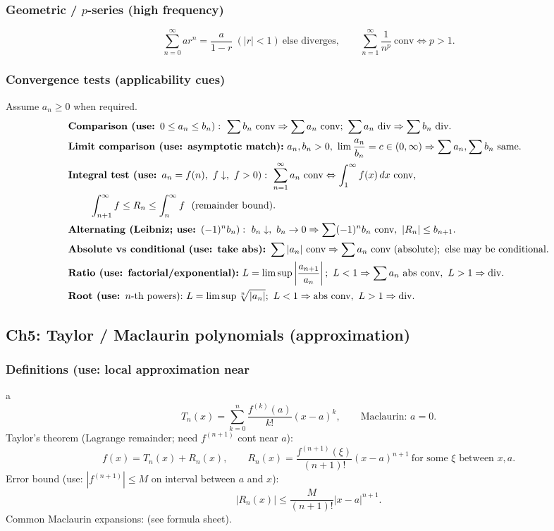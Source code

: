 \documentclass[12pt]{article}
\begin{document}
\subsubsection{Geometric / $p$-series (high frequency)}
\[
\sum_{n=0}^{\infty}ar^n=
\frac{a}{1-r}\ (|r|<1)\ \text{else diverges},\qquad
\sum_{n=1}^{\infty}\frac{1}{n^p}\ \text{conv}\Leftrightarrow p>1.
\]

\subsubsection{Convergence tests (applicability cues)}
Assume $a_n\ge 0$ when required.
\begin{align*}
&\textbf{Comparison (use: }0\le a_n\le b_n):\ \sum b_n\ \text{conv}\Rightarrow\sum a_n\ \text{conv};\ \sum a_n\ \text{div}\Rightarrow\sum b_n\ \text{div}.\\
&\textbf{Limit comparison (use: asymptotic match):}\ a_n,b_n>0,\ \lim \frac{a_n}{b_n}=c\in(0,\infty)\Rightarrow \sum a_n,\sum b_n\ \text{same}.\\
&\textbf{Integral test (use: }a_n=f(n),\ f\downarrow,\ f>0):\ \sum_{n=1}^{\infty}a_n\ \text{conv}\Leftrightarrow \int_1^{\infty} f(x)\,dx\ \text{conv},\\
&\hspace{2.2em}\int_{n+1}^{\infty} f\le R_n\le \int_n^{\infty} f\ \ (\text{remainder bound}).\\
&\textbf{Alternating (Leibniz; use: }(-1)^n b_n):\ b_n\downarrow,\ b_n\to 0\Rightarrow \sum (-1)^n b_n\ \text{conv},\ |R_n|\le b_{n+1}.\\
&\textbf{Absolute vs conditional (use: take abs):}\ \sum |a_n|\ \text{conv}\Rightarrow \sum a_n\ \text{conv (absolute)};\ \text{else may be conditional}.\\
&\textbf{Ratio (use: factorial/exponential):}\ L=\limsup\left|\frac{a_{n+1}}{a_n}\right|;\ L<1\Rightarrow \sum a_n\ \text{abs conv},\ L>1\Rightarrow \text{div}.\\
&\textbf{Root (use: }n\text{-th powers):}\ L=\limsup \sqrt[n]{|a_n|};\ L<1\Rightarrow \text{abs conv},\ L>1\Rightarrow \text{div}.
\end{align*}

\subsection{Ch5: Taylor / Maclaurin polynomials (approximation)}
\subsubsection{Definitions (use: local approximation near }a\text{)}
\[
T_n(x)=\sum_{k=0}^{n}\frac{f^{(k)}(a)}{k!}(x-a)^k,\qquad
\text{Maclaurin: }a=0.
\]
Taylor's theorem (Lagrange remainder; need $f^{(n+1)}$ cont near $a$):
\[
f(x)=T_n(x)+R_n(x),\qquad
R_n(x)=\frac{f^{(n+1)}(\xi)}{(n+1)!}(x-a)^{n+1}\ \text{for some }\xi\text{ between }x,a.
\]
Error bound (use: $|f^{(n+1)}|\le M$ on interval between $a$ and $x$):
\[
|R_n(x)|\le \frac{M}{(n+1)!}|x-a|^{n+1}.
\]
Common Maclaurin expansions: (see formula sheet).
\end{document}
